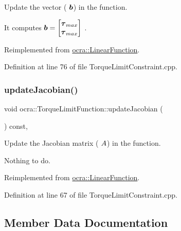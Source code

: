 Update the vector ( $ \mbox{\boldmath${b}$} $) in the function.

It computes $ \mbox{\boldmath${b}$} = \begin{bmatrix} \mbox{\boldmath${\tau}$}_{max} \\ \mbox{\boldmath${\tau}$}_{max} \end{bmatrix} $ . 

Reimplemented from \hyperlink{classocra_1_1LinearFunction_a546454cd8d0909f99433ffc0e700c9e3}{ocra\+::\+Linear\+Function}.



Definition at line 76 of file Torque\+Limit\+Constraint.\+cpp.

\hypertarget{classocra_1_1TorqueLimitFunction_ad33a9f6f6af6edd6b3c0cda6f915336b}{}\label{classocra_1_1TorqueLimitFunction_ad33a9f6f6af6edd6b3c0cda6f915336b} 
\subsubsection{\texorpdfstring{update\+Jacobian()}{updateJacobian()}}
{\footnotesize\ttfamily void ocra\+::\+Torque\+Limit\+Function\+::update\+Jacobian (\begin{DoxyParamCaption}{ }\end{DoxyParamCaption}) const\hspace{0.3cm}{\ttfamily [protected]}, {\ttfamily [virtual]}}

Update the Jacobian matrix ( $ A $) in the function.

Nothing to do. 

Reimplemented from \hyperlink{classocra_1_1LinearFunction_a30926f977c0124a0b0f65b854ab39636}{ocra\+::\+Linear\+Function}.



Definition at line 67 of file Torque\+Limit\+Constraint.\+cpp.



\subsection{Member Data Documentation}
\hypertarget{classocra_1_1TorqueLimitFunction_ae7eed81decd37aa8bb6baeb47c5fb4d0}{}\label{classocra_1_1TorqueLimitFunction_ae7eed81decd37aa8bb6baeb47c5fb4d0} 
